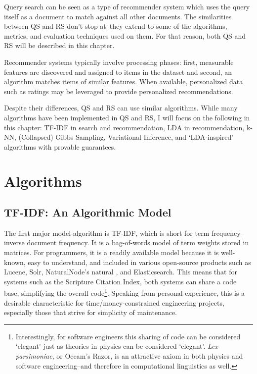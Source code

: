 Query search can be seen as a type of recommender system which uses the query itself as a document to match against all other documents. The similarities between QS and RS don't stop at--they extend to some of the algorithms, metrics, and evaluation techniques used on them. For that reason, both QS and RS will be described in this chapter. %


Recommender systems typically involve processing phases: first, measurable features are discovered and assigned to items in the dataset and second, an algorithm matches items of similar features. When available, personalized data such as ratings may be leveraged to provide personalized recommendations.

Despite their differences, QS and RS can use similar algorithms. While many algorithms have been implemented in QS and RS, I will focus on the following in this chapter: TF-IDF in search and recommendation, LDA in recommendation, k-NN, (Collapsed) Gibbs Sampling, Variational Inference, and `LDA-inspired' algorithms with provable guarantees.

\section{Algorithms}
\subsection{TF-IDF: An Algorithmic Model}
The first major model-algorithm is TF-IDF, which is short for term frequency–inverse document frequency. It is a bag-of-words model of term weights stored in matrices. For programmers, it is a readily available model because it is well-known, easy to understand, and included in various open-source products such as Lucene\textregistered \citep{McCandless:2010:LAS:1893016}, Solr\textregistered \citep{apache_solr_beginners_guide_2013,apache_solr_enterprise_search_server_2015}, NaturalNode's natural \citep{github-NaturalNode-natural}, and Elasticsearch\textregistered \citep{es-site}. This means that for systems such as the Scripture Citation Index, both systems can share a code base, simplifying the overall code\footnote{Interestingly, for software engineers this sharing of code can be considered `elegant' just as theories in physics can be considered `elegant'. \textit{Lex parsimoniae}, or Occam's Razor, is an attractive axiom in both physics and software engineering--and therefore in computational linguistics as well.}. Speaking from personal experience, this is a desirable characteristic for time/money-constrained engineering projects, especially those that strive for simplicity of maintenance.

